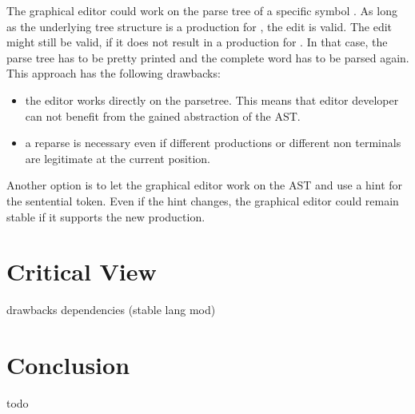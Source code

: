 The graphical editor could work on the parse tree of a specific symbol .  As long as the underlying tree structure is a production for , the edit is valid. The edit might still be valid, if it does not result in a production for . In that case, the parse tree has to be pretty printed and the complete word has to be parsed again. This approach has the following drawbacks:
\begin{itemize}
	\item the editor works directly on the parsetree. This means that editor developer can not benefit from the gained abstraction of the AST.
	\item a reparse is necessary even if different productions or different non terminals are legitimate at the current position. 
\end{itemize}

Another option is to let the graphical editor work on the AST and use a hint for the sentential token. Even if the hint changes, the graphical editor could remain stable if it supports the new production. 


\section{Critical View}
drawbacks 
dependencies (stable lang mod)

\section{Conclusion}
todo